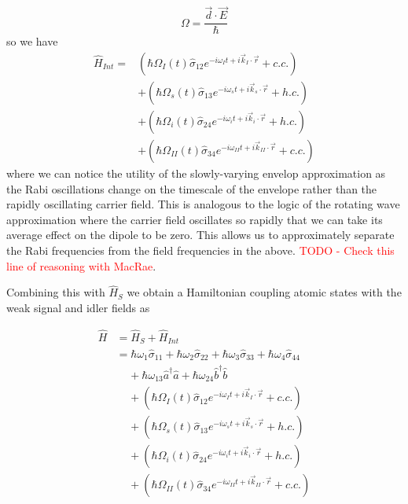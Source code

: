 \documentclass[aps,pra,showpacs,amsmath,amssymb,nofootinbib,longbibliography,superscriptaddress
]{revtex4-1}
\theoremstyle{definition}
\theoremstyle{remark}
\newcommand{\0}{\hat{0}}
\begin{document}
\begin{equation}
    \Omega = \frac{\vec{d} \cdot \vec{E}}{\hbar}
\end{equation}
so we have
\begin{align}
    \hat{H}_{Int} = &\left(\hbar \Omega_{I}(t) \hat{\sigma}_{12} e^{-i \omega_I t + i \vec{k}_I \cdot \vec{r}} + c.c.\right)\nonumber \\
    &+ \left(\hbar \Omega_{s}(t) \hat{\sigma}_{13} e^{-i \omega_s t + i \vec{k}_{s} \cdot \vec{r}} + h.c.\right)\nonumber \\
    &+ \left(\hbar \Omega_{i}(t) \hat{\sigma}_{24} e^{-i \omega_{i} t + i \vec{k}_{i} \cdot \vec{r}} + h.c.\right)\nonumber \\
    &+ \left(\hbar \Omega_{II}(t) \hat{\sigma}_{34} e^{-i \omega_{II} t + i \vec{k}_{II} \cdot \vec{r}} + c.c.\right)
\end{align}
where we can notice the utility of the slowly-varying envelop approximation as the Rabi oscillations change on the timescale of the envelope rather than the rapidly oscillating carrier field. This is analogous to the logic of the rotating wave approximation where the carrier field oscillates so rapidly that we can take its average effect on the dipole to be zero. This allows us to approximately separate the Rabi frequencies from the field frequencies in the above. \textcolor{red}{TODO - Check this line of reasoning with MacRae}.

Combining this with $\hat{H}_S$ we obtain a Hamiltonian coupling atomic states with the weak signal and idler fields as

\begin{align}
    \hat{H} &= \hat{H}_S + \hat{H}_{Int}\\
    &= \hbar \omega_1 \hat{\sigma}_{11} + \hbar \omega_2 \hat{\sigma}_{22} + \hbar \omega_3 \hat{\sigma}_{33} + \hbar \omega_4 \hat{\sigma}_{44}\nonumber \\
    &\;\;\;\;+ \hbar \omega_{13} \hat{a}^{\dagger} \hat{a} + \hbar \omega_{24} \hat{b}^{\dagger} \hat{b}\nonumber \\
    &\;\;\;\;+ \left(\hbar \Omega_{I}(t) \hat{\sigma}_{12} e^{-i \omega_I t + i \vec{k}_I \cdot \vec{r}} + c.c.\right)\nonumber \\
    &\;\;\;\;+ \left(\hbar \Omega_{s}(t) \hat{\sigma}_{13} e^{-i \omega_s t + i \vec{k}_{s} \cdot \vec{r}} + h.c.\right)\nonumber \\
    &\;\;\;\;+ \left(\hbar \Omega_{i}(t) \hat{\sigma}_{24} e^{-i \omega_{i} t + i \vec{k}_{i} \cdot \vec{r}} + h.c.\right)\nonumber \\
    &\;\;\;\;+ \left(\hbar \Omega_{II}(t) \hat{\sigma}_{34} e^{-i \omega_{II} t + i \vec{k}_{II} \cdot \vec{r}} + c.c.\right)
\end{align}
\end{document}
